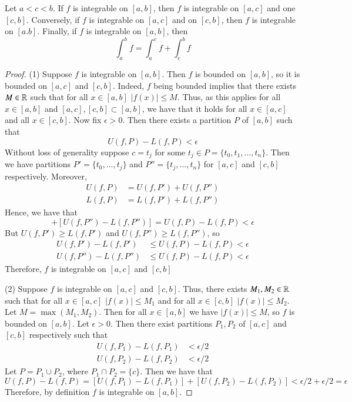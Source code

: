 \documentclass[12pt, a4paper, oneside, openright, titlepage]{book}
\begin{document}
\begin{thm}
    Let $a < c < b$. If $f$ is integrable on $[a,b]$, then $f$ is integrable on $[a,c]$ and one $[c,b]$. Conversely, if $f$ is integrable on $[a,c]$ and on $[c,b]$, then $f$ is integrable on $[a.b]$. Finally, if $f$ is integrable on $[a,b]$, then \begin{equation}
        \int_a^bf = \int_a^cf + \int_c^bf
    \end{equation}
\end{thm}
\begin{proof}

    (1) Suppose $f$ is integrable on $[a,b]$. Then $f$ is bounded on $[a,b]$, so it is bounded on $[a,c]$ and $[c,b]$. Indeed, $f$ being bounded implies that there exists $M \in \mathbb R$ such that for all $x \in [a,b]$ $|f(x)| \leq M$. Thus, as this applies for all $x \in [a,b]$ and $[a,c],[c,b] \subset [a,b]$, we have that it holds for all $x \in [a,c]$ and all $x \in [c,b]$. Now fix $\epsilon > 0$. Then there exists a partition $P$ of $[a,b]$ such that $$U(f,P) - L(f,P) < \epsilon$$
    Without loss of generality suppose $c=t_j$ for some $t_j \in P = \{t_0,t_1,...,t_n\}$. Then we have partitions $P' = \{t_0,...,t_j\}$ and $P'' = \{t_j,...,t_n\}$ for $[a,c]$ and $[c,b]$ respectively. Moreover, \begin{align*}
        U(f,P) &= U(f,P') + U(f,P'') \\
        L(f,P) &= L(f,P') + L(f,P'')
    \end{align*}
    Hence, we have that \begin{equation*}
        [U(f,P') - L(f,P')] + [U(f,P'') - L(f,P'')] = U(f,P) - L(f,P) < \epsilon
    \end{equation*}
    But $U(f,P') \geq L(f,P')$ and $U(f,P'') \geq L(f,P'')$, so \begin{align*}
        U(f,P') - L(f,P') &\leq U(f,P) - L(f,P) < \epsilon \\
        U(f,P'') - L(f,P'') &\leq U(f,P) - L(f,P) < \epsilon
    \end{align*}
    Therefore, $f$ is integrable on $[a,c]$ and $[c,b]$


    (2) Suppose $f$ is integrable on $[a,c]$ and $[c,b]$. Thus, there exists $M_1, M_2 \in \mathbb R$ such that for all $x \in [a,c]$ $|f(x)| \leq M_1$ and for all $x \in [c,b]$ $|f(x)| \leq M_2$. Let $M = \max(M_1,M_2)$. Then for all $x \in [a,b]$ we have $|f(x)| \leq M$, so $f$ is bounded on $[a,b]$. Let $\epsilon > 0$. Then there exist partitions $P_1,P_2$ of $[a,c]$ and $[c,b]$ respectively such that \begin{align*}
        U(f,P_1) - L(f,P_1) &< \epsilon/2 \\
        U(f,P_2) - L(f,P_2) &< \epsilon/2
    \end{align*}
    Let $P = P_1 \cup P_2$, where $P_1 \cap P_2 = \{c\}$. Then we have that \begin{equation*}
        U(f,P) - L(f,P) = [U(f,P_1) - L(f,P_1)] + [U(f,P_2) - L(f,P_2)] < \epsilon/2 + \epsilon/2 = \epsilon
    \end{equation*}
    Therefore, by definition $f$ is integrable on $[a,b]$.
    


\end{proof}
\end{document}
